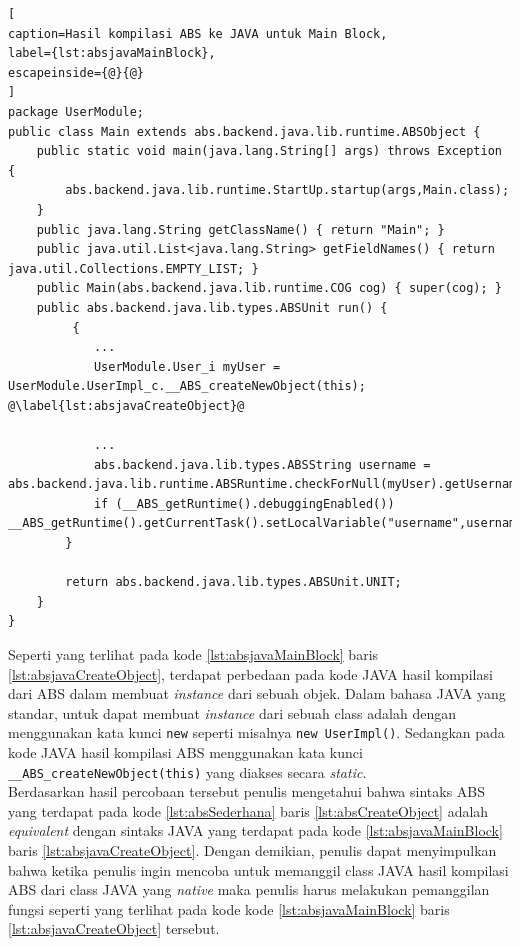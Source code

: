 \begin{lstlisting}[
caption=Hasil kompilasi ABS ke JAVA untuk Main Block,
label={lst:absjavaMainBlock},
escapeinside={@}{@}
]
package UserModule;
public class Main extends abs.backend.java.lib.runtime.ABSObject {
    public static void main(java.lang.String[] args) throws Exception {
        abs.backend.java.lib.runtime.StartUp.startup(args,Main.class);
    }
    public java.lang.String getClassName() { return "Main"; }
    public java.util.List<java.lang.String> getFieldNames() { return java.util.Collections.EMPTY_LIST; }
    public Main(abs.backend.java.lib.runtime.COG cog) { super(cog); }
    public abs.backend.java.lib.types.ABSUnit run() {
         {
            ...
            UserModule.User_i myUser = UserModule.UserImpl_c.__ABS_createNewObject(this); @\label{lst:absjavaCreateObject}@
            
            ...
            abs.backend.java.lib.types.ABSString username = abs.backend.java.lib.runtime.ABSRuntime.checkForNull(myUser).getUsername();
            if (__ABS_getRuntime().debuggingEnabled()) __ABS_getRuntime().getCurrentTask().setLocalVariable("username",username);
        }
        
        return abs.backend.java.lib.types.ABSUnit.UNIT;
    }
}
\end{lstlisting}

Seperti yang terlihat pada kode \ref{lst:absjavaMainBlock} baris \ref{lst:absjavaCreateObject}, terdapat perbedaan pada kode JAVA hasil kompilasi dari ABS dalam membuat \textit{instance} dari sebuah objek. Dalam bahasa JAVA yang standar, untuk dapat membuat \textit{instance} dari sebuah class adalah dengan menggunakan kata kunci \texttt{new} seperti misalnya \texttt{new UserImpl()}. Sedangkan pada kode JAVA hasil kompilasi ABS menggunakan kata kunci \texttt{\_\_ABS\_createNewObject(this)} yang diakses secara \textit{static}.\\

Berdasarkan hasil percobaan tersebut penulis mengetahui bahwa sintaks ABS yang terdapat pada kode \ref{lst:absSederhana} baris \ref{lst:absCreateObject} adalah \textit{equivalent} dengan sintaks JAVA yang terdapat pada kode \ref{lst:absjavaMainBlock} baris \ref{lst:absjavaCreateObject}. Dengan demikian, penulis dapat menyimpulkan bahwa ketika penulis ingin mencoba untuk memanggil class JAVA hasil kompilasi ABS dari class JAVA yang \textit{native} maka penulis harus melakukan pemanggilan fungsi seperti yang terlihat pada kode kode \ref{lst:absjavaMainBlock} baris \ref{lst:absjavaCreateObject} tersebut.\\

